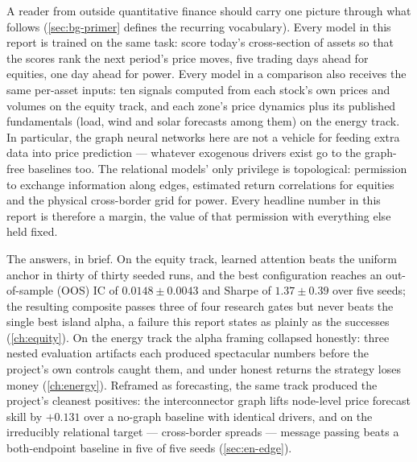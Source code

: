 A reader from outside quantitative finance should carry one picture
through what follows (\cref{sec:bg-primer} defines the recurring
vocabulary). Every model in this report is trained on the same task:
score today's cross-section of assets so that the scores rank the next
period's price moves, five trading days ahead for equities, one day
ahead for power. Every model in a comparison also receives the same
per-asset inputs: ten signals computed from each stock's own prices and
volumes on the equity track, and each zone's price dynamics plus its
published fundamentals (load, wind and solar forecasts among them) on
the energy track. In particular, the graph neural networks here are not
a vehicle for feeding extra data into price prediction --- whatever
exogenous drivers exist go to the graph-free baselines too. The
relational models' only privilege is topological: permission to
exchange information along edges, estimated return correlations for
equities and the physical cross-border grid for power. Every headline
number in this report is therefore a margin, the value of that
permission with everything else held fixed.

The answers, in brief. On the equity track, learned attention beats the
uniform anchor in thirty of thirty seeded runs, and the best
configuration reaches an out-of-sample (OOS) IC of $0.0148 \pm 0.0043$ and
Sharpe of $1.37 \pm 0.39$ over five seeds; the resulting composite
passes three of four research gates but never beats the single best
island alpha, a failure this report states as plainly as the successes
(\cref{ch:equity}). On the energy track the alpha framing collapsed
honestly: three nested evaluation artifacts each produced spectacular
numbers before the project's own controls caught them, and under honest
returns the strategy loses money (\cref{ch:energy}). Reframed as
forecasting, the same track produced the project's cleanest positives:
the interconnector graph lifts node-level price forecast skill by
$+0.131$ over a no-graph baseline with identical drivers, and on the
irreducibly relational target --- cross-border spreads --- message
passing beats a both-endpoint baseline in five of five seeds
(\cref{sec:en-edge}).

